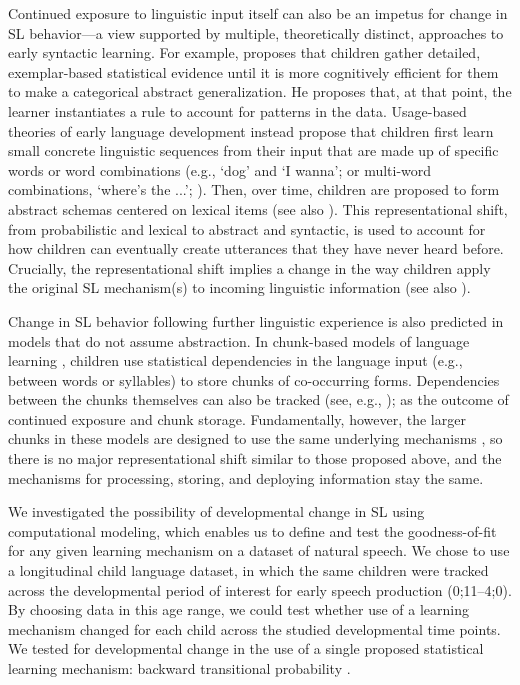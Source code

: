 \documentclass{article}
\begin{document}
Continued exposure to linguistic input itself can also be an impetus for change in SL behavior---a view supported by multiple, theoretically distinct, approaches to early syntactic learning. For example,  proposes that children gather detailed, exemplar-based statistical evidence until it is more cognitively efficient for them to make a categorical abstract generalization. He proposes that, at that point, the learner instantiates a rule to account for patterns in the data. Usage-based theories of early language development instead propose that children first learn small concrete linguistic sequences from their input that are made up of specific words or word combinations (e.g., `dog' and `I wanna'; or multi-word combinations, `where's the ...'; ). Then, over time, children are proposed to form abstract schemas centered on lexical items (see also ). This representational shift, from probabilistic and lexical to abstract and syntactic, is used to account for how children can eventually create utterances that they have never heard before. Crucially, the representational shift implies a change in the way children apply the original SL mechanism(s) to incoming linguistic information (see also ).

Change in SL behavior following further linguistic experience is also predicted in models that do not assume abstraction. In chunk-based models of language learning \cite{arnon2017, christiansen2016now, christiansen2017more, clair2010learning, misyak2012statistical}, children use statistical dependencies in the language input (e.g., between words or syllables) to store chunks of co-occurring forms. Dependencies between the chunks themselves can also be tracked (see, e.g., ); as the outcome of continued exposure and chunk storage. Fundamentally, however, the larger chunks in these models are designed to use the same underlying mechanisms \cite{misyak2012statistical}, so there is no major representational shift similar to those proposed above, and the mechanisms for processing, storing, and deploying information stay the same.

We investigated the possibility of developmental change in SL using computational modeling, which enables us to define and test the goodness-of-fit for any given learning mechanism on a dataset of natural speech. We chose to use a longitudinal child language dataset, in which the same children were tracked across the developmental period of interest for early speech production (0;11--4;0). By choosing data in this age range, we could test whether use of a learning mechanism changed for each child across the studied developmental time points. We tested for developmental change in the use of a single proposed statistical learning mechanism: backward transitional probability \cite{mccauley2011learning, onnis2013language, pelucchi2009learning}.
\end{document}

